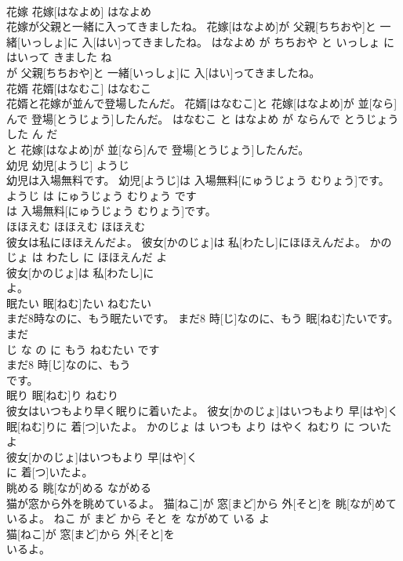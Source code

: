 \documentclass[8pt]{extreport}
\begin{document}
\begin{CJK}{UTF8}{min}
\\	花嫁	花嫁[はなよめ]	はなよめ	
\\	花嫁が父親と一緒に入ってきましたね。	花嫁[はなよめ]が 父親[ちちおや]と 一緒[いっしょ]に 入[はい]ってきましたね。	はなよめ が ちちおや と いっしょ に はいって きました ね	
\\	が 父親[ちちおや]と 一緒[いっしょ]に 入[はい]ってきましたね。			
\\	花婿	花婿[はなむこ]	はなむこ	
\\	花婿と花嫁が並んで登場したんだ。	花婿[はなむこ]と 花嫁[はなよめ]が 並[なら]んで 登場[とうじょう]したんだ。	はなむこ と はなよめ が ならんで とうじょう した ん だ	
\\	と 花嫁[はなよめ]が 並[なら]んで 登場[とうじょう]したんだ。			
\\	幼児	幼児[ようじ]	ようじ	
\\	幼児は入場無料です。	幼児[ようじ]は 入場無料[にゅうじょう むりょう]です。	ようじ は にゅうじょう むりょう です	
\\	は 入場無料[にゅうじょう むりょう]です。			
\\	ほほえむ	ほほえむ	ほほえむ	
\\	彼女は私にほほえんだよ。	彼女[かのじょ]は 私[わたし]にほほえんだよ。	かのじょ は わたし に ほほえんだ よ	
\\	彼女[かのじょ]は 私[わたし]に
\\	よ。			
\\	眠たい	眠[ねむ]たい	ねむたい	
\\	まだ8時なのに、もう眠たいです。	まだ8 時[じ]なのに、もう 眠[ねむ]たいです。	まだ 
\\	じ な の に もう ねむたい です	
\\	まだ8 時[じ]なのに、もう
\\	です。			
\\	眠り	眠[ねむ]り	ねむり	
\\	彼女はいつもより早く眠りに着いたよ。	彼女[かのじょ]はいつもより 早[はや]く 眠[ねむ]りに 着[つ]いたよ。	かのじょ は いつも より はやく ねむり に ついた よ	
\\	彼女[かのじょ]はいつもより 早[はや]く
\\	に 着[つ]いたよ。			
\\	眺める	眺[なが]める	ながめる	
\\	猫が窓から外を眺めているよ。	猫[ねこ]が 窓[まど]から 外[そと]を 眺[なが]めているよ。	ねこ が まど から そと を ながめて いる よ	
\\	猫[ねこ]が 窓[まど]から 外[そと]を
\\	いるよ。			

\end{CJK}
\end{document}
